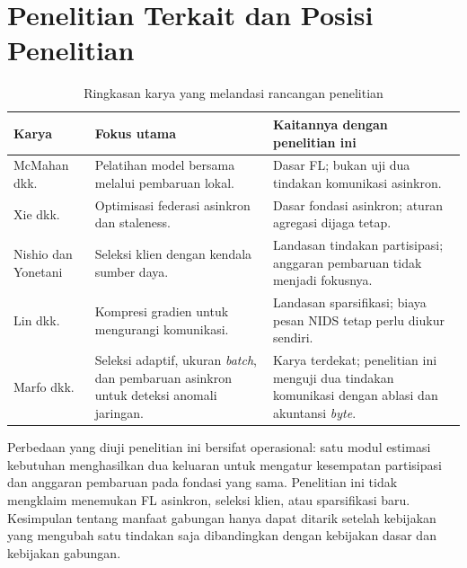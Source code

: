 \section{Penelitian Terkait dan Posisi Penelitian}
\begin{table}[ht]
\centering
\caption{Ringkasan karya yang melandasi rancangan penelitian}
\label{tab:terkait}
\small
\begin{tabular}{>{\raggedright\arraybackslash}p{2.6cm}>{\raggedright\arraybackslash}p{5.0cm}>{\raggedright\arraybackslash}p{4.9cm}}
\toprule
Karya & Fokus utama & Kaitannya dengan penelitian ini \\
\midrule
McMahan dkk. \cite{mcmahan2017} & Pelatihan model bersama melalui pembaruan lokal. & Dasar FL; bukan uji dua tindakan komunikasi asinkron. \\
Xie dkk. \cite{xie2019} & Optimisasi federasi asinkron dan staleness. & Dasar fondasi asinkron; aturan agregasi dijaga tetap. \\
Nishio dan Yonetani \cite{nishio2019} & Seleksi klien dengan kendala sumber daya. & Landasan tindakan partisipasi; anggaran pembaruan tidak menjadi fokusnya. \\
Lin dkk. \cite{lin2018} & Kompresi gradien untuk mengurangi komunikasi. & Landasan sparsifikasi; biaya pesan NIDS tetap perlu diukur sendiri. \\
Marfo dkk. \cite{marfo2025} & Seleksi adaptif, ukuran \textit{batch}, dan pembaruan asinkron untuk deteksi anomali jaringan. & Karya terdekat; penelitian ini menguji dua tindakan komunikasi dengan ablasi dan akuntansi \textit{byte}. \\
\bottomrule
\end{tabular}
\end{table}

Perbedaan yang diuji penelitian ini bersifat operasional: satu modul estimasi kebutuhan menghasilkan dua keluaran untuk mengatur kesempatan partisipasi dan anggaran pembaruan pada fondasi yang sama. Penelitian ini tidak mengklaim menemukan FL asinkron, seleksi klien, atau sparsifikasi baru. Kesimpulan tentang manfaat gabungan hanya dapat ditarik setelah kebijakan yang mengubah satu tindakan saja dibandingkan dengan kebijakan dasar dan kebijakan gabungan.

